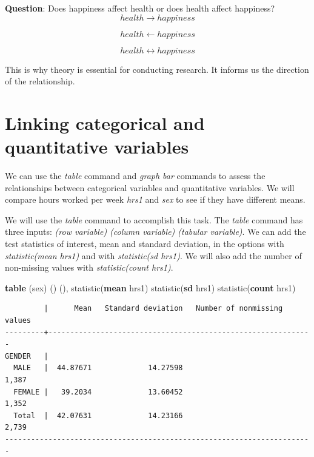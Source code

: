 \documentclass[
]{book}
\newenvironment{Shaded}{\begin{snugshade}}{\end{snugshade}}
\newcommand{\FunctionTok}[1]{\textcolor[rgb]{0.13,0.29,0.53}{\textbf{#1}}}
\newcommand{\KeywordTok}[1]{\textcolor[rgb]{0.13,0.29,0.53}{\textbf{#1}}}
\newcommand{\NormalTok}[1]{#1}
\begin{document}
\textbf{Question}: Does happiness affect health or does health affect happiness?
\[ health \rightarrow happiness \]

\[ health \leftarrow happiness \]

\[ health \leftrightarrow happiness \]

This is why theory is essential for conducting research. It informs us the direction of the relationship.

\section{Linking categorical and quantitative variables}\label{linking-categorical-and-quantitative-variables}

We can use the \emph{table} command and \emph{graph bar} commands to assess the relationships between categorical variables and quantitative variables. We will compare hours worked per week \emph{hrs1} and \emph{sex} to see if they have different means.

We will use the \emph{table} command to accomplish this task. The \emph{table} command has three inputs: \emph{(row variable) (column variable) (tabular variable)}. We can add the test statistics of interest, mean and standard deviation, in the options with \emph{statistic(mean hrs1)} and with \emph{statistic(sd hrs1)}. We will also add the number of non-missing values with \emph{statistic(count hrs1)}.

\begin{Shaded}
\begin{Highlighting}[]
\KeywordTok{table}\NormalTok{ (sex) () (), statistic(}\KeywordTok{mean}\NormalTok{ hrs1) statistic(}\FunctionTok{sd}\NormalTok{ hrs1) statistic(}\FunctionTok{count}\NormalTok{ hrs1)}
\end{Highlighting}
\end{Shaded}

\begin{verbatim}
         |      Mean   Standard deviation   Number of nonmissing values
---------+-------------------------------------------------------------
GENDER   |                                                             
  MALE   |  44.87671             14.27598                         1,387
  FEMALE |   39.2034             13.60452                         1,352
  Total  |  42.07631             14.23166                         2,739
-----------------------------------------------------------------------
\end{verbatim}
\end{document}
